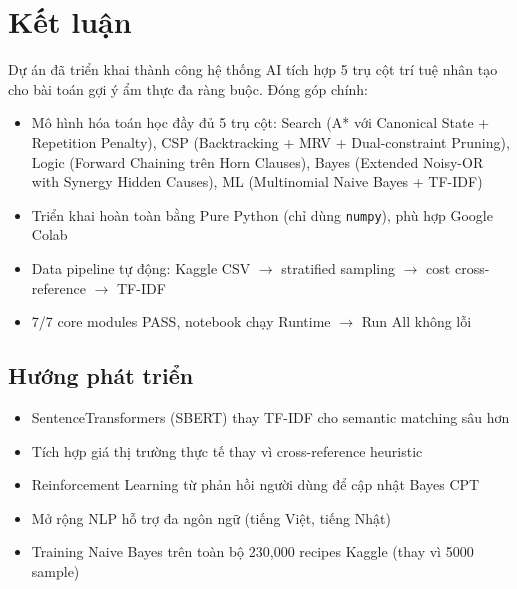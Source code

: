 \section{Kết luận}

Dự án đã triển khai thành công hệ thống AI tích hợp 5 trụ cột trí tuệ nhân tạo cho bài toán gợi ý ẩm thực đa ràng buộc. Đóng góp chính:

\begin{itemize}
  \item Mô hình hóa toán học đầy đủ 5 trụ cột: Search (A* với Canonical State + Repetition Penalty), CSP (Backtracking + MRV + Dual-constraint Pruning), Logic (Forward Chaining trên Horn Clauses), Bayes (Extended Noisy-OR with Synergy Hidden Causes), ML (Multinomial Naive Bayes + TF-IDF)
  \item Triển khai hoàn toàn bằng Pure Python (chỉ dùng \texttt{numpy}), phù hợp Google Colab
  \item Data pipeline tự động: Kaggle CSV $\to$ stratified sampling $\to$ cost cross-reference $\to$ TF-IDF
  \item 7/7 core modules PASS, notebook chạy Runtime $\to$ Run All không lỗi
\end{itemize}

\subsection{Hướng phát triển}
\begin{itemize}
  \item SentenceTransformers (SBERT) thay TF-IDF cho semantic matching sâu hơn
  \item Tích hợp giá thị trường thực tế thay vì cross-reference heuristic
  \item Reinforcement Learning từ phản hồi người dùng để cập nhật Bayes CPT
  \item Mở rộng NLP hỗ trợ đa ngôn ngữ (tiếng Việt, tiếng Nhật)
  \item Training Naive Bayes trên toàn bộ 230,000 recipes Kaggle (thay vì 5000 sample)
\end{itemize}
